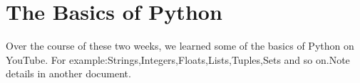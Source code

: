 \section{The Basics of Python}
Over the course of these two weeks, we learned some of the basics of Python on YouTube. For example:Strings,Integers,Floats,Lists,Tuples,Sets and so on.Note details in another document.


